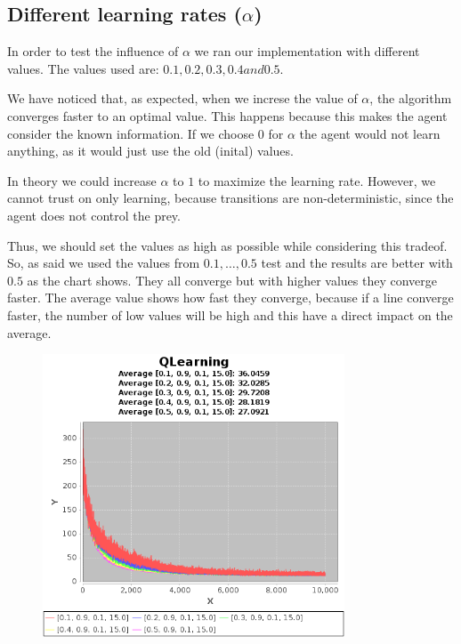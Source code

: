 \documentclass{article}
\begin{document}
\subsection{Different learning rates ($\alpha$)}
In order to test the influence of $\alpha$ we ran our implementation with
different values. The values used are:
$0.1 , 0.2, 0.3, 0.4 and 0.5$. 

We have noticed that, as expected, when we increse the value of $\alpha$, the 
algorithm converges faster to an optimal value. This happens because this makes the agent
consider the known information. If we choose $0$ for $\alpha$ the agent
would not learn anything, as it would just use the old (inital) values.

In theory we could increase $\alpha$ to $1$ to maximize the learning rate. However, we cannot trust on only learning, because transitions are non-deterministic, since the agent does not control the prey.

Thus, we should set the values as high as possible while considering this tradeof.
So, as said we used the values from $0.1, \ldots , 0.5$ test and the results are
better with $0.5$ as the chart shows. They all converge but with higher values
they converge faster. The average value shows how fast they converge, because if
a line converge faster, the number of low values will be high and this have a
direct impact on the average.

\begin{figure}[h]
\centering
\includegraphics[width=0.8\textwidth]{res/alpha_01_to_05_gama_09_epsilon_01_IV_15.png}
\end{figure}
\end{document}
